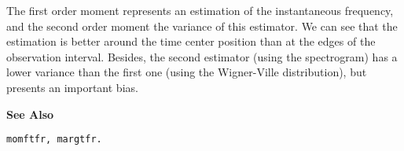 
\hspace*{1.5cm}
\begin{minipage}[t]{13.5cm}
The first order moment represents an estimation of the instantaneous
frequency, and the second order moment the variance of this estimator. We
can see that the estimation is better around the time center position than
at the edges of the observation interval. Besides, the second estimator
(using the spectrogram) has a lower variance than the first one (using the
Wigner-Ville distribution), but presents an important bias.
\end{minipage}
\vspace*{1cm}


{\bf \large {}\selectfont See Also}\\
\hspace*{1.5cm}
\begin{minipage}[t]{13.5cm}
\begin{verbatim}
momftfr, margtfr.
\end{verbatim}
\end{minipage}

